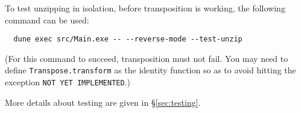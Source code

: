 \documentclass{article}
\begin{document}
To test unzipping in isolation,
before transposition is working,
the following command can be used:
\begin{verbatim}
  dune exec src/Main.exe -- --reverse-mode --test-unzip
\end{verbatim}
(For this command to succeed, transposition must not fail.
You may need to define \texttt{Transpose.transform} as the
identity function so as to avoid hitting the exception
\texttt{NOT YET IMPLEMENTED}.)

More details about testing are given in \S\ref{sec:testing}.



%

%
%
%
\end{document}
